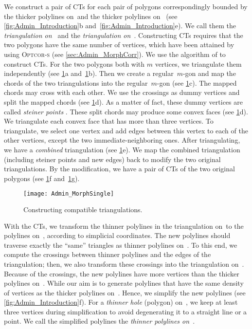 We construct a pair of CTs
for each pair of polygons correspondingly bounded
by the thicker polylines on~\ml and 
the thicker polylines on~\ms
(see \figs\ref{fig:Admin_Introduction}b
and~\ref{fig:Admin_Introduction}e). 
We call them the \emph{triangulation on~\ml} and 
the \emph{triangulation on~\ms}. 
Constructing CTs requires that
the two polygons have the same number of vertices,
which have been attained by using \textsc{Optcor-s}
(see \sect\ref{sec:Admin_MorphCorr}). 
We use the algorithm of \textcite{AronovSS93}
to construct CTs. 
For the two polygons both with $m$ vertices, 
we triangulate them independently
(see \figs\ref{fig:Admin_ConstructCTs}a 
and~\ref{fig:Admin_ConstructCTs}b). 
Then we create a regular~$m$-gon and 
map the chords of the two triangulations 
into the regular~$m$-gon
(see \figs\ref{fig:Admin_ConstructCTs}c). 
The mapped chords may cross with each other.
We use the crossings as dummy vertices and
split the mapped chords
(see \figs\ref{fig:Admin_ConstructCTs}d). 
As a matter of fact, these dummy vertices are called 
\emph{steiner points} \parencite{AronovSS93}.
These split chords may produce some convex faces
(see \fig\ref{fig:Admin_ConstructCTs}d).
We triangulate each convex face
that has more than three vertices. 
To triangulate, we select one vertex and 
add edges between 
this vertex to each of the other vertices, 
except the two immediate-neighboring ones. 
After triangulating, we have 
a \emph{combined} triangulation
(see \fig\ref{fig:Admin_ConstructCTs}e).
We map the combined triangulation 
(including steiner points and new edges)
back to modify the two original triangulations. 
By the modification, we have a pair of 
CTs of the two original polygons
(see \figs\ref{fig:Admin_ConstructCTs}f 
and~\ref{fig:Admin_ConstructCTs}g).

\begin{figure}[tb]
	\centering
	\texttt{[image: Admin\_MorphSingle]}
	\caption{Constructing compatible triangulations.}
	\label{fig:Admin_ConstructCTs}
\end{figure}


With the CTs, 
we transform the thinner polylines in the 
triangulation on~\ml to the polylines on~\ms, 
according to simplicial coordinates. 
The new polylines should traverse exactly the ``same'' 
triangles as thinner polylines on~\ml.
To this end, we compute the crossings 
between thinner polylines and 
the edges of the triangulation; 
then, we also transform these crossings
into the triangulation on~\ms. 
Because of the crossings, the new polylines have
more vertices than the thicker polylines on~\ml. 
While our aim is to generate polylines that have
the same density of vertices as the thicker polylines on~\ms. 
Hence, we simplify the new polylines 
(see \fig\ref{fig:Admin_Introduction}f). 
For a \emph{thinner hole} (polygon) on~\ms, 
we keep at least three vertices during simplification 
to avoid degenerating
it to a straight line or a point.
We call the simplified polylines 
the \emph{thinner polylines on~\ms}.

